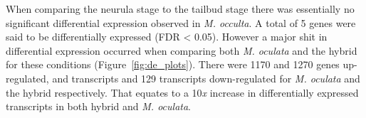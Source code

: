 When comparing the neurula stage to the tailbud stage there was essentially no significant differential expression observed in \textit{M. occulta}. A total of 5 genes were said to be differentially expressed (FDR < 0.05). However a major shit in differential expression occurred when comparing both \textit{M. oculata} and the hybrid for these conditions (Figure~\ref{fig:de_plots}). There were 1170 and 1270 genes up-regulated, and transcripts and 129 transcripts down-regulated for \textit{M. oculata} and the hybrid respectively. That equates to a 10\textit{x} increase in differentially expressed transcripts in both hybrid and \textit{M. oculata}.


\begin{figure}
\end{figure}
